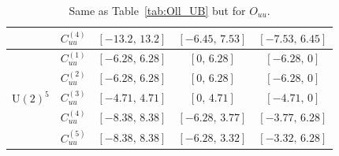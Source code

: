 \begin{table}[tbp]
{\begin{tabular}{ccccc}
        & $C_{uu}^{(4)}$ & $[-13.2,\, 13.2]$  & $[-6.45,\, 7.53]$  & $[-7.53,\, 6.45]$ \\
    \midrule
    \multirow{5}{*}{$\mathrm{U}(2)^5$}
        & $C_{uu}^{(1)}$ & $[-6.28,\, 6.28]$ & $[0,\, 6.28]$      & $[-6.28,\, 0]$    \\
        & $C_{uu}^{(2)}$ & $[-6.28,\, 6.28]$ & $[0,\, 6.28]$      & $[-6.28,\, 0]$    \\
        & $C_{uu}^{(3)}$ & $[-4.71,\, 4.71]$ & $[0,\, 4.71]$      & $[-4.71,\, 0]$    \\
        & $C_{uu}^{(4)}$ & $[-8.38,\, 8.38]$ & $[-6.28,\, 3.77]$  & $[-3.77,\, 6.28]$ \\
        & $C_{uu}^{(5)}$ & $[-8.38,\, 8.38]$ & $[-6.28,\, 3.32]$  & $[-3.32,\, 6.28]$ \\
    \bottomrule
\end{tabular}}
\caption{Same as Table~\ref{tab:Oll_UB} but for $O_{uu}$.}
\label{tab:Ouu_UB}
\end{table}

